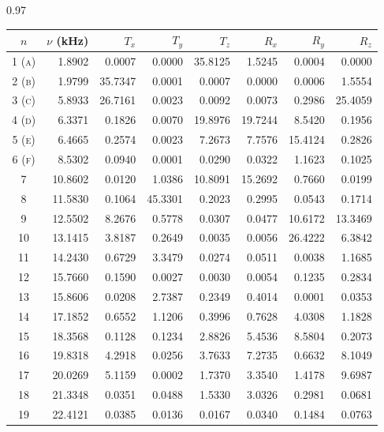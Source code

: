 \documentclass[../Thesis-IJspeert.tex]{subfiles}
\begin{document}
\begin{spacing}{0.97}
	\begin{small}
		\begin{longtable}{crrrrrrr}
			\toprule
			{$n$} & {$\nu$ (\si{\kilo\hertz})} & {${T}_x$} & {${T}_y$} & {${T}_z$} & {${R}_x$} & {${R}_y$} & {${R}_z$} \\
			\midrule
			1 \textsc{(a)} & 1.8902 & 0.0007 & 0.0000 & 35.8125 & 1.5245 & 0.0004 & 0.0000 \\  
			2 \textsc{(b)} & 1.9799 & 35.7347 & 0.0001 & 0.0007 & 0.0000 & 0.0006 & 1.5554 \\  
			3 \textsc{(c)} & 5.8933 & 26.7161 & 0.0023 & 0.0092 & 0.0073 & 0.2986 & 25.4059 \\  
			4 \textsc{(d)} & 6.3371 & 0.1826 & 0.0070 & 19.8976 & 19.7244 & 8.5420 & 0.1956 \\  
			5 \textsc{(e)} & 6.4665 & 0.2574 & 0.0023 & 7.2673 & 7.7576 & 15.4124 & 0.2826 \\  
			6 \textsc{(f)} & 8.5302 & 0.0940 & 0.0001 & 0.0290 & 0.0322 & 1.1623 & 0.1025 \\  
			7 & 10.8602 & 0.0120 & 1.0386 & 10.8091 & 15.2692 & 0.7660 & 0.0199 \\  
			8 & 11.5830 & 0.1064 & 45.3301 & 0.2023 & 0.2995 & 0.0543 & 0.1714 \\  
			9 & 12.5502 & 8.2676 & 0.5778 & 0.0307 & 0.0477 & 10.6172 & 13.3469 \\  
			10 & 13.1415 & 3.8187 & 0.2649 & 0.0035 & 0.0056 & 26.4222 & 6.3842 \\  
			11 & 14.2430 & 0.6729 & 3.3479 & 0.0274 & 0.0511 & 0.0038 & 1.1685 \\  
			12 & 15.7660 & 0.1590 & 0.0027 & 0.0030 & 0.0054 & 0.1235 & 0.2834 \\  
			13 & 15.8606 & 0.0208 & 2.7387 & 0.2349 & 0.4014 & 0.0001 & 0.0353 \\  
			14 & 17.1852 & 0.6552 & 1.1206 & 0.3996 & 0.7628 & 4.0308 & 1.1828 \\  
			15 & 18.3568 & 0.1128 & 0.1234 & 2.8826 & 5.4536 & 8.5804 & 0.2073 \\  
			16 & 19.8318 & 4.2918 & 0.0256 & 3.7633 & 7.2735 & 0.6632 & 8.1049 \\  
			17 & 20.0269 & 5.1159 & 0.0002 & 1.7370 & 3.3540 & 1.4178 & 9.6987 \\  
			18 & 21.3348 & 0.0351 & 0.0488 & 1.5330 & 3.0326 & 0.2981 & 0.0681 \\  
			19 & 22.4121 & 0.0385 & 0.0136 & 0.0167 & 0.0340 & 0.1484 & 0.0763 \\  

\end{longtable}
\end{small}
\end{spacing}
\end{document}
